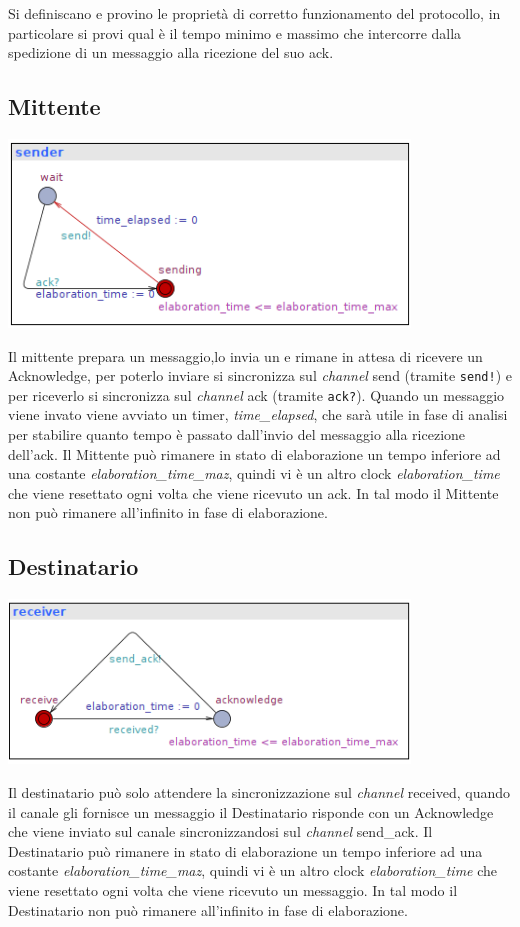 \documentclass[a4paper]{article}
\newcommand{\channel}{\textit{channel }}
\begin{document}
Si definiscano e provino le proprietà di corretto funzionamento del protocollo, in particolare si provi qual è il tempo minimo e massimo che intercorre dalla spedizione di un messaggio alla ricezione del suo ack.
\subsection{Mittente}
\begin{center}\includegraphics[width=0.8\textwidth]{1_sender.png}\end{center}
Il mittente prepara un messaggio,lo invia un e rimane in attesa di ricevere un Acknowledge, per poterlo inviare si sincronizza sul \channel send (tramite \texttt{send!}) e per riceverlo si sincronizza sul \channel ack (tramite \texttt{ack?}).
Quando un messaggio viene invato viene avviato un timer, \textit{time\_elapsed}, che sarà utile in fase di analisi per stabilire quanto tempo è passato dall'invio del messaggio alla ricezione dell'ack.
Il Mittente può rimanere in stato di elaborazione un tempo inferiore ad una costante \textit{elaboration\_time\_maz}, quindi vi è un altro clock \textit{elaboration\_time} che viene resettato ogni volta che viene ricevuto un ack.
In tal modo il Mittente non può rimanere all'infinito in fase di elaborazione.
\subsection{Destinatario}
\begin{center}\includegraphics[width=0.8\textwidth]{1_receiver.png}\end{center}
Il destinatario può solo attendere la sincronizzazione sul \channel received, quando il canale gli fornisce un messaggio il Destinatario risponde con un Acknowledge che viene inviato sul canale sincronizzandosi sul \channel send\_ack.
Il Destinatario può rimanere in stato di elaborazione un tempo inferiore ad una costante \textit{elaboration\_time\_maz}, quindi vi è un altro clock \textit{elaboration\_time} che viene resettato ogni volta che viene ricevuto un messaggio.
In tal modo il Destinatario non può rimanere all'infinito in fase di elaborazione.
\end{document}
